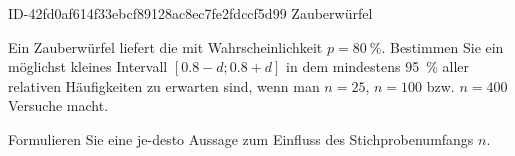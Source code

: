 \begin{exercise}
      {ID-42fd0af614f33ebcf89128ac8ec7fe2fdccf5d99}
      {Zauberwürfel}
  \ifproblem\problem\par
    Ein Zauberwürfel liefert die \grqq{} mit
    Wahrscheinlichkeit $p=\SI{80}{\percent}$.
    Bestimmen Sie ein möglichst kleines Intervall
    $[\num{0.8}-d;\num{0.8}+d]$ in dem mindestens
    \SI{95}{\percent} aller relativen Häufigkeiten
    zu erwarten sind, wenn man $n=\num{25}$,
    $n=\num{100}$ bzw. $n=\num{400}$ Versuche macht.
    \par
    Formulieren Sie eine \glqq je-desto Aussage\grqq
    zum Einfluss des Stichprobenumfangs $n$.
  \fi
\end{exercise}
